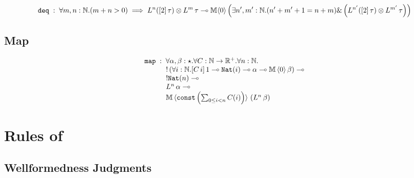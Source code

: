 
$$
\texttt{deq} \; : \; \forall m,n : \N. (m + n > 0) \implies L^n([2] \, \tau) \otimes L^m \, \tau \loli \M \langle 0 \rangle \left(\exists n',m' : \N. (n' + m' + 1 = n + m) \amp \left(L^{n'}([2] \, \tau) \otimes L^{m'} \, \tau\right)\right)
$$

\subsection{Map}

$$
\begin{array}{l}
\texttt{map} \; : \; \forall \alpha,\beta : \star. \forall C : \N \to \R^+. \forall n : \N. \\
\hspace{3em} !\left(\forall i : \N. [C \, i] \, 1 \loli \texttt{Nat}(i) \loli \alpha \loli \M \, \langle 0 \rangle\,  \beta\right) \loli\\
\hspace{3em}  !\texttt{Nat}(n) \loli \\
\hspace{3em}  L^n \,\alpha \loli\\ 
\hspace{3em}  \M \, \langle \texttt{const}\left(\sum_{0 \leq i < n} C(i)\right) \rangle\, \left(L^n \, \beta\right)
\end{array}
$$

\section{Rules of \dlambdaamor}

\subsection{Wellformedness Judgments}
\begin{mathpar}



\end{mathpar}


